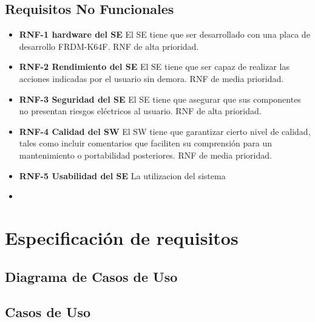 \subsection{Requisitos No Funcionales}
\begin{itemize}
  	\item \textbf{RNF-1 hardware del SE} El SE tiene que ser desarrollado con una placa de desarrollo FRDM-K64F. RNF de alta prioridad.
  	\item \textbf{RNF-2 Rendimiento del SE} El SE tiene que ser capaz de realizar las acciones indicadas por el usuario sin demora. RNF de media prioridad.
  	\item \textbf{RNF-3 Seguridad del SE} El SE tiene que asegurar que sus componentes no presentan riesgos eléctricos al usuario. RNF de alta prioridad. 
  	\item \textbf{RNF-4 Calidad del SW} El SW tiene que garantizar cierto nivel de calidad, tales como incluir comentarios que faciliten su comprensión para un mantenimiento o portabilidad posteriores. RNF de media prioridad.
  	\item \textbf{RNF-5 Usabilidad del SE} La utilizacion del sistema
  	\item \textbf{}
\end{itemize}



\section{Especificación de requisitos}

\subsection{Diagrama de Casos de Uso}

\subsection{Casos de Uso}

